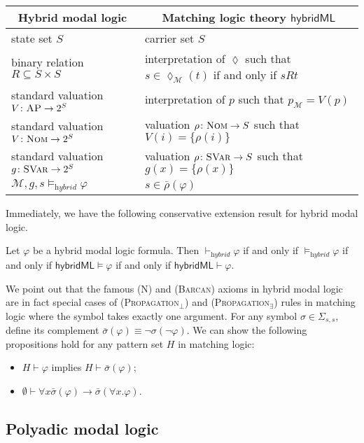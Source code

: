 \documentclass[acmsmall,review,anonymous]{acmart}
\newcommand{\imp}{\to}
\newcommand{\SVar}{\textnormal{\textsc{SVar}}}
\newcommand{\Nom}{\textnormal{\textsc{Nom}}}
\newcommand{\MM}{\mathcal{M}}
\newcommand{\pset}[1]{2^{#1}}
\newcommand{\barrho}{\bar{\rho}}
\newcommand{\MLhybridML}{\mathsf{hybridML}}
\newcommand{\hybridModalLogic}{\textit{hybrid}}
\newcommand{\prule}[1]{\textsc{(#1)}}
\newcommand{\propagationbottom}{\prule{Propagation$_\bot$}\xspace}
\newcommand{\propagationexists}{\prule{Propagation$_\exists$}\xspace}
\newcommand{\sigmabar}{\bar{\sigma}}
\newcommand{\AP}{\textsc{AP}}
\newcommand{\eventually}{{\lozenge}}
\begin{document}
\begin{center}
\begin{tabular}{ll}
\multicolumn{1}{c}{Hybrid modal logic} & 
\multicolumn{1}{c}{Matching logic theory $\MLhybridML$}
\\\hline
state set $S$ & carrier set $S$
\\
binary relation $R \subseteq S \times S$ & interpretation of $\eventually$ such that
                      $s \in \eventually_\MM (t)$ if and only if $s R t$
\\
standard valuation $V \colon \AP \to \pset{S}$
& interpretation of $p$ such that $p_\MM = V(p)$
\\
standard valuation $V \colon \Nom \to \pset{S}$
& valuation $\rho \colon \Nom \to S$ such that
$V(i) = \{ \rho(i) \}$
\\
standard valuation $g \colon \SVar \to \pset{S}$
& valuation $\rho \colon \SVar \to S$ such that
$g(x) = \{ \rho(x) \}$
\\
$\MM,g,s \vDash_\hybridModalLogic \varphi$
& $s \in \barrho(\varphi)$
\end{tabular}
\end{center}
Immediately, we have the following conservative extension result for hybrid modal logic.
\begin{theorem}
Let $\varphi$ be a hybrid modal logic formula.
Then
$\vdash_\hybridModalLogic \varphi$ if and only if
$\vDash_\hybridModalLogic \varphi$ if and only if 
$\MLhybridML \vDash \varphi$ if and only if
$\MLhybridML \vdash \varphi$.
\end{theorem}

We point out that the famous \prule{N} and \prule{Barcan} axioms
in hybrid modal logic
are in fact special cases
of \propagationbottom and \propagationexists rules
in matching logic where the symbol takes exactly one argument.
For any symbol $\sigma \in \Sigma_{s,s}$,
define its complement $\sigmabar (\varphi) \equiv \neg \sigma(\neg \varphi)$.
We can show the following propositions hold for
any pattern set $H$ in matching logic:
\begin{itemize}
\item $H \vdash \varphi$ implies $H \vdash \sigmabar(\varphi)$;
\item $\emptyset \vdash \forall x  \sigmabar(\varphi) \imp \sigmabar(\forall x . \varphi)$.
\end{itemize}

\subsection{Polyadic modal logic}
\end{document}
